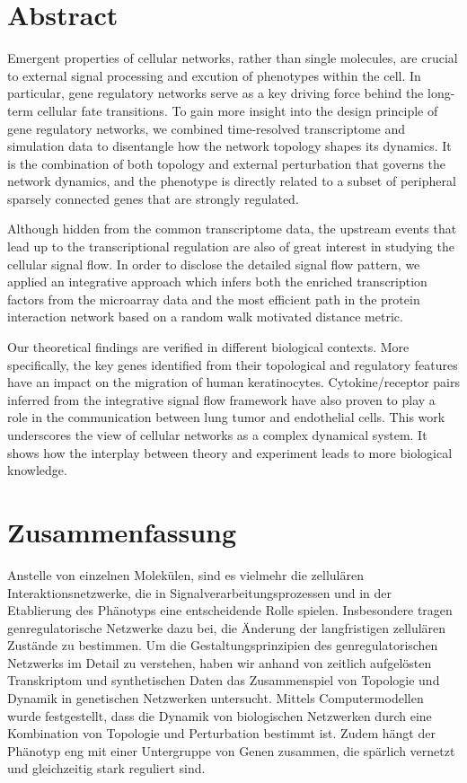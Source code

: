 \chapter*{Abstract}


Emergent properties of cellular networks, rather than single molecules, 
are crucial to external signal processing and excution of phenotypes
within the cell. In particular, gene regulatory networks serve as a key
driving force behind the long-term cellular fate transitions. To gain more
insight into the design principle of gene regulatory networks, we combined
time-resolved transcriptome and simulation data to disentangle how the
network topology shapes its dynamics. It is the combination of both topology
and external perturbation that governs the network dynamics, and 
the phenotype is directly related to a subset of
peripheral sparsely connected genes that are strongly regulated. 

Although hidden from the common transcriptome data, 
the upstream events that lead up to the 
transcriptional regulation are also of great interest in studying the 
cellular signal flow. In order to disclose the detailed signal flow pattern,
we applied an integrative approach which infers both the enriched 
transcription factors from the microarray data and the most efficient path
in the protein interaction network based on a random walk motivated distance
metric.

Our theoretical findings are verified in different biological contexts. More
specifically, the key genes identified from their topological and regulatory
features have an impact on the migration of human keratinocytes. 
Cytokine/receptor pairs inferred from the integrative signal flow framework
have also proven to play a role in the communication between lung tumor
and endothelial cells. This work underscores the view of
cellular networks as a complex dynamical system.
It shows how the interplay between theory
and experiment leads to more biological knowledge.

\chapter*{Zusammenfassung}


Anstelle von einzelnen Molek\"ulen,
sind es vielmehr die zellul\"aren Interaktionsnetzwerke,
die in Signalverarbeitungsprozessen und in der Etablierung des
Ph\"anotyps eine entscheidende Rolle spielen. 
Insbesondere tragen genregulatorische Netzwerke
dazu bei, die \"Anderung der langfristigen zellul\"aren
Zust\"ande zu bestimmen. Um die Gestaltungsprinzipien des
genregulatorischen Netzwerks im
Detail zu verstehen, haben wir anhand von zeitlich 
aufgel\"osten Transkriptom und synthetischen Daten
das Zusammenspiel von Topologie
und Dynamik in genetischen Netzwerken untersucht.
Mittels Computermodellen wurde festgestellt, dass
die Dynamik von biologischen Netzwerken durch eine 
Kombination von
Topologie und Perturbation bestimmt ist.
Zudem h\"angt der Ph\"anotyp eng mit einer Untergruppe
von Genen zusammen, die sp\"arlich vernetzt und gleichzeitig
stark reguliert sind. 

